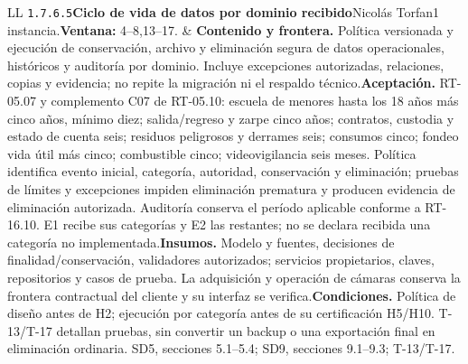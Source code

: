 \begin{longtable}{L{\tabcolsep\relax}L{\tabcolsep\relax}}
\texttt{1.\allowbreak{}7.\allowbreak{}6.\allowbreak{}5}\newline{}\textbf{Ciclo de vida de datos por dominio recibido}\newline{}Nicolás Torfan\newline{}1 instancia.\newline{}\textbf{Ventana:} 4--8,13--17. & \textbf{Contenido y frontera.} Política versionada y ejecución de conservación, archivo y eliminación segura de datos operacionales, históricos y auditoría por dominio. Incluye excepciones autorizadas, relaciones, copias y evidencia; no repite la migración ni el respaldo técnico.\newline{}\textbf{Aceptación.} RT-05.07 y complemento C07 de RT-05.10: escuela de menores hasta los 18 años más cinco años, mínimo diez; salida/regreso y zarpe cinco años; contratos, custodia y estado de cuenta seis; residuos peligrosos y derrames seis; consumos cinco; fondeo vida útil más cinco; combustible cinco; videovigilancia seis meses. Política identifica evento inicial, categoría, autoridad, conservación y eliminación; pruebas de límites y excepciones impiden eliminación prematura y producen evidencia de eliminación autorizada. Auditoría conserva el período aplicable conforme a RT-16.10. E1 recibe sus categorías y E2 las restantes; no se declara recibida una categoría no implementada.\newline{}\textbf{Insumos.} Modelo y fuentes, decisiones de finalidad/conservación, validadores autorizados; servicios propietarios, claves, repositorios y casos de prueba. La adquisición y operación de cámaras conserva la frontera contractual del cliente y su interfaz se verifica.\newline{}\textbf{Condiciones.} Política de diseño antes de H2; ejecución por categoría antes de su certificación H5/H10. T-13/T-17 detallan pruebas, sin convertir un backup o una exportación final en eliminación ordinaria. SD5, secciones 5.1--5.4; SD9, secciones 9.1--9.3; T-13/T-17.\\\hline

\end{longtable}
